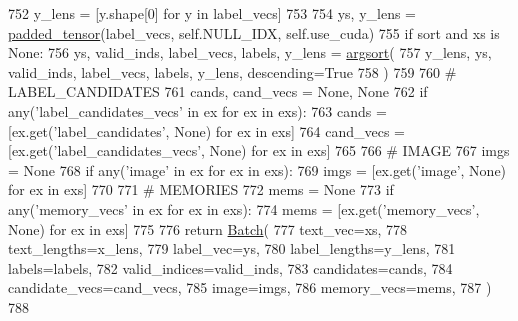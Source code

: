 \begin{DoxyCode}
752             y\_lens = [y.shape[0] \textcolor{keywordflow}{for} y \textcolor{keywordflow}{in} label\_vecs]
753 
754             ys, y\_lens = \hyperlink{namespaceparlai_1_1agents_1_1legacy__agents_1_1seq2seq_1_1utils__v1_adb5a414ae439f14c54e8c760b91cc4c8}{padded\_tensor}(label\_vecs, self.NULL\_IDX, self.use\_cuda)
755             \textcolor{keywordflow}{if} sort \textcolor{keywordflow}{and} xs \textcolor{keywordflow}{is} \textcolor{keywordtype}{None}:
756                 ys, valid\_inds, label\_vecs, labels, y\_lens = \hyperlink{namespaceparlai_1_1agents_1_1legacy__agents_1_1seq2seq_1_1utils__v1_a1521e559b740f741ebb47b8755202bb2}{argsort}(
757                     y\_lens, ys, valid\_inds, label\_vecs, labels, y\_lens, descending=\textcolor{keyword}{True}
758                 )
759 
760         \textcolor{comment}{# LABEL\_CANDIDATES}
761         cands, cand\_vecs = \textcolor{keywordtype}{None}, \textcolor{keywordtype}{None}
762         \textcolor{keywordflow}{if} any(\textcolor{stringliteral}{'label\_candidates\_vecs'} \textcolor{keywordflow}{in} ex \textcolor{keywordflow}{for} ex \textcolor{keywordflow}{in} exs):
763             cands = [ex.get(\textcolor{stringliteral}{'label\_candidates'}, \textcolor{keywordtype}{None}) \textcolor{keywordflow}{for} ex \textcolor{keywordflow}{in} exs]
764             cand\_vecs = [ex.get(\textcolor{stringliteral}{'label\_candidates\_vecs'}, \textcolor{keywordtype}{None}) \textcolor{keywordflow}{for} ex \textcolor{keywordflow}{in} exs]
765 
766         \textcolor{comment}{# IMAGE}
767         imgs = \textcolor{keywordtype}{None}
768         \textcolor{keywordflow}{if} any(\textcolor{stringliteral}{'image'} \textcolor{keywordflow}{in} ex \textcolor{keywordflow}{for} ex \textcolor{keywordflow}{in} exs):
769             imgs = [ex.get(\textcolor{stringliteral}{'image'}, \textcolor{keywordtype}{None}) \textcolor{keywordflow}{for} ex \textcolor{keywordflow}{in} exs]
770 
771         \textcolor{comment}{# MEMORIES}
772         mems = \textcolor{keywordtype}{None}
773         \textcolor{keywordflow}{if} any(\textcolor{stringliteral}{'memory\_vecs'} \textcolor{keywordflow}{in} ex \textcolor{keywordflow}{for} ex \textcolor{keywordflow}{in} exs):
774             mems = [ex.get(\textcolor{stringliteral}{'memory\_vecs'}, \textcolor{keywordtype}{None}) \textcolor{keywordflow}{for} ex \textcolor{keywordflow}{in} exs]
775 
776         \textcolor{keywordflow}{return} \hyperlink{namespaceparlai_1_1agents_1_1legacy__agents_1_1seq2seq_1_1torch__agent__v1_a74cfde390a2b9861179ac0fcd59da28c}{Batch}(
777             text\_vec=xs,
778             text\_lengths=x\_lens,
779             label\_vec=ys,
780             label\_lengths=y\_lens,
781             labels=labels,
782             valid\_indices=valid\_inds,
783             candidates=cands,
784             candidate\_vecs=cand\_vecs,
785             image=imgs,
786             memory\_vecs=mems,
787         )
788 
\end{DoxyCode}
